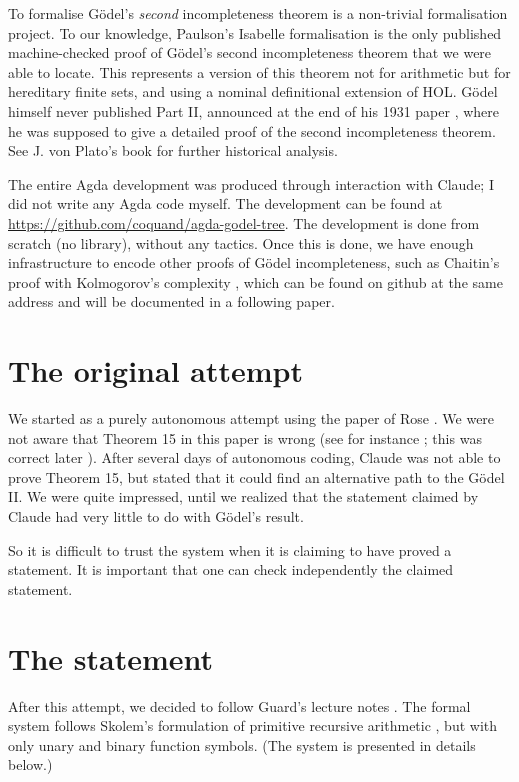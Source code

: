 \documentclass[11pt]{article}
\theoremstyle{plain}
\theoremstyle{definition}
\theoremstyle{remark}
\begin{document}
To formalise G\"odel's {\em second} incompleteness theorem  is a non-trivial formalisation project. To our knowledge, Paulson's
Isabelle formalisation \cite{Paulson14}
is the only published machine-checked proof of Gödel's second incompleteness theorem that we were able to locate.
This represents a version of this theorem not for arithmetic but for hereditary finite sets, and using a nominal
definitional extension of HOL. G\"odel himself never published Part II, announced at the end of his 1931 paper \cite{Goedel31},
where he was supposed to give a detailed proof of the second incompleteness theorem. See J. von Plato's book \cite{vonPlato20}
for further historical analysis.

The entire Agda development was produced through interaction with Claude; I did not write any Agda code myself.
The development can be found at \url{https://github.com/coquand/agda-godel-tree}. The development is done from
scratch (no library), without any tactics. Once this is done, we have enough infrastructure to encode other proofs
of G\"odel incompleteness, such as Chaitin's proof with Kolmogorov's complexity \cite{Chaitin74},
which can be found on github at the
same address and will be documented in a following paper.

\section{The original attempt}

 We started as a purely autonomous attempt using the paper of Rose \cite{Rose61}.
 We were not aware that Theorem 15 in this paper is wrong (see for instance \cite{Cook75}; this was
 correct later \cite{Rose67}).
After several days of autonomous coding, Claude was not able to prove Theorem 15,
but stated that it could find an alternative path to the G\"odel II.
We were quite impressed, until we realized that the statement claimed by Claude had very
little to do with G\"odel's result.

So it is difficult to trust the system when it is claiming to have proved a statement. It is
important that one can check independently the claimed statement.

\section{The statement}

After this attempt, we decided to follow Guard's lecture notes \cite{Guard63}. The formal system
follows Skolem's formulation of primitive recursive arithmetic \cite{Skolem23}, but with only
unary and binary function symbols. (The system is presented in details below.)
\end{document}
